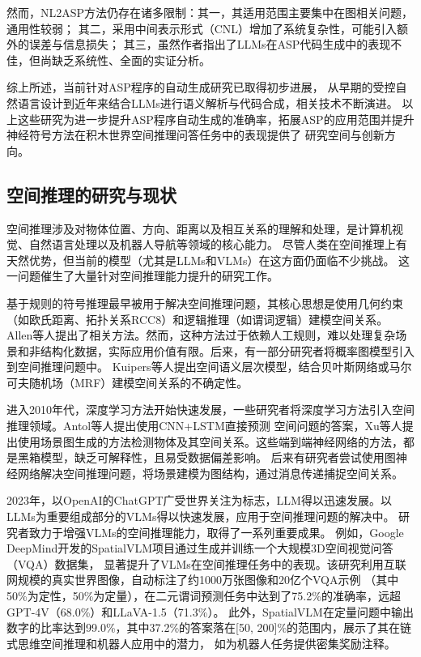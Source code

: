 然而，NL2ASP方法仍存在诸多限制：其一，其适用范围主要集中在图相关问题，通用性较弱；
其二，采用中间表示形式（CNL）增加了系统复杂性，可能引入额外的误差与信息损失；
其三，虽然作者指出了LLMs在ASP代码生成中的表现不佳，但尚缺乏系统性、全面的实证分析。

综上所述，当前针对ASP程序的自动生成研究已取得初步进展，
从早期的受控自然语言设计到近年来结合LLMs进行语义解析与代码合成，相关技术不断演进。
以上这些研究为进一步提升ASP程序自动生成的准确率，拓展ASP的应用范围并提升神经符号方法在积木世界空间推理问答任务中的表现提供了
研究空间与创新方向。
\subsection{空间推理的研究与现状}
空间推理涉及对物体位置、方向、距离以及相互关系的理解和处理，是计算机视觉、自然语言处理以及机器人导航等领域的核心能力。
尽管人类在空间推理上有天然优势，但当前的模型（尤其是LLMs和VLMs）在这方面仍面临不少挑战。
这一问题催生了大量针对空间推理能力提升的研究工作。

基于规则的符号推理最早被用于解决空间推理问题，其核心思想是使用几何约束（如欧氏距离、拓扑关系RCC8）和逻辑推理（如谓词逻辑）建模空间关系。
Allen等人提出了相关方法。然而，这种方法过于依赖人工规则，难以处理复杂场景和非结构化数据，实际应用价值有限。后来，有一部分研究者将概率图模型引入到空间推理问题中。
Kuipers等人提出空间语义层次模型，结合贝叶斯网络或马尔可夫随机场（MRF）建模空间关系的不确定性。

进入2010年代，深度学习方法开始快速发展，一些研究者将深度学习方法引入空间推理领域。Antol等人\cite{Antol2015VQA}提出使用CNN+LSTM直接预测
空间问题的答案，Xu等人\cite{xu2017scene}提出使用场景图生成的方法检测物体及其空间关系。这些端到端神经网络的方法，都是黑箱模型，缺乏可解释性，且易受数据偏差影响。
后来有研究者尝试使用图神经网络解决空间推理问题，将场景建模为图结构，通过消息传递捕捉空间关系。

2023年，以OpenAI的ChatGPT广受世界关注为标志，LLM得以迅速发展。以LLMs为重要组成部分的VLMs得以快速发展，应用于空间推理问题的解决中。
研究者致力于增强VLMs的空间推理能力，取得了一系列重要成果。
例如，Google DeepMind开发的SpatialVLM\cite{chen2024spatialvlmendowingvisionlanguagemodels}项目通过生成并训练一个大规模3D空间视觉问答（VQA）数据集，
显著提升了VLMs在空间推理任务中的表现。该研究利用互联网规模的真实世界图像，自动标注了约1000万张图像和20亿个VQA示例
（其中50\%为定性，50\%为定量），在二元谓词预测任务中达到了75.2\%的准确率，远超GPT-4V（68.0\%）和LLaVA-1.5（71.3\%）。
此外，SpatialVLM在定量问题中输出数字的比率达到99.0\%，其中37.2\%的答案落在[50, 200]\%的范围内，展示了其在链式思维空间推理和机器人应用中的潜力，
如为机器人任务提供密集奖励注释。


